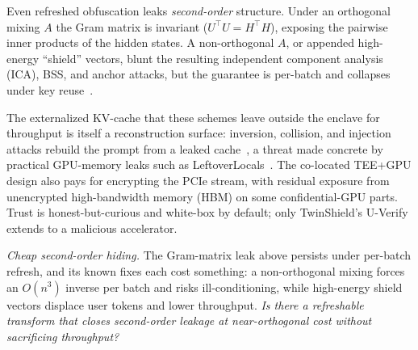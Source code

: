Even refreshed obfuscation leaks \emph{second-order} structure. Under an orthogonal mixing
$A$ the Gram matrix is invariant ($U^{\top}U{=}H^{\top}H$), exposing the pairwise inner
products of the hidden states. A non-orthogonal $A$, or appended high-energy ``shield''
vectors, blunt the resulting independent component analysis (ICA), BSS,
and anchor attacks, but the guarantee is per-batch and
collapses under key reuse~\citep{belikov_gelo}.

The externalized KV-cache that these schemes
leave outside the enclave for throughput is itself a reconstruction
surface: inversion, collision, and injection attacks rebuild the prompt from a leaked
cache~\citep{luo_shadowcache}, a threat made concrete by practical GPU-memory leaks such as
LeftoverLocals~\citep{leftoverlocals}. The co-located TEE+GPU design also pays for encrypting
the PCIe stream, with residual exposure from unencrypted high-bandwidth memory (HBM) on some confidential-GPU parts.
Trust is honest-but-curious and white-box by default; only TwinShield's U-Verify extends to
a malicious accelerator.

\begin{openproblem}
\emph{Cheap second-order hiding.} The Gram-matrix leak above persists under per-batch refresh, and
its known fixes each cost something: a non-orthogonal mixing forces an $O(n^3)$ inverse per batch and
risks ill-conditioning, while high-energy shield vectors displace user tokens and lower throughput.
\emph{Is there a refreshable transform that closes second-order leakage at near-orthogonal cost without
sacrificing throughput?}
\end{openproblem}

